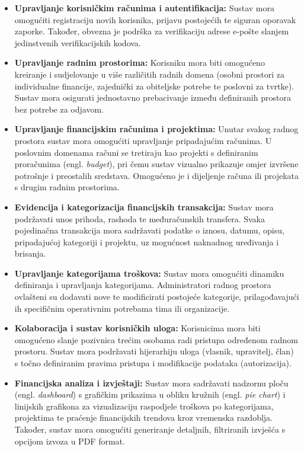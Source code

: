 \documentclass[a4paper,12pt,oneside]{article}
\begin{document}
	\begin{itemize}
		\item \textbf{Upravljanje korisničkim računima i autentifikacija:} Sustav mora omogućiti registraciju novih korisnika, prijavu postojećih te siguran oporavak zaporke. Također, obvezna je podrška za verifikaciju adrese e-pošte slanjem jedinstvenih verifikacijskih kodova.
		
		\item \textbf{Upravljanje radnim prostorima:} Korisniku mora biti omogućeno kreiranje i sudjelovanje u više različitih radnih domena (osobni prostori za individualne financije, zajednički za obiteljske potrebe te poslovni za tvrtke). Sustav mora osigurati jednostavno prebacivanje između definiranih prostora bez potrebe za odjavom.
		
		\item \textbf{Upravljanje financijskim računima i projektima:} Unutar svakog radnog prostora sustav mora omogućiti upravljanje pripadajućim računima. U poslovnim domenama računi se tretiraju kao projekti s definiranim proračunima (engl. \textit{budget}), pri čemu sustav vizualno prikazuje omjer izvršene potrošnje i preostalih sredstava. Omogućeno je i dijeljenje računa ili projekata s drugim radnim prostorima.
		
		\item \textbf{Evidencija i kategorizacija financijskih transakcija:} Sustav mora podržavati unos prihoda, rashoda te međuračunskih transfera. Svaka pojedinačna transakcija mora sadržavati podatke o iznosu, datumu, opisu, pripadajućoj kategoriji i projektu, uz mogućnost naknadnog uređivanja i brisanja.
		
		\item \textbf{Upravljanje kategorijama troškova:} Sustav mora omogućiti dinamiku definiranja i upravljanja kategorijama. Administratori radnog prostora ovlašteni su dodavati nove te modificirati postojeće kategorije, prilagođavajući ih specifičnim operativnim potrebama tima ili organizacije.
		
		\item \textbf{Kolaboracija i sustav korisničkih uloga:} Korisnicima mora biti omogućeno slanje pozivnica trećim osobama radi pristupa određenom radnom prostoru. Sustav mora podržavati hijerarhiju uloga (vlasnik, upravitelj, član) s točno definiranim pravima pristupa i modifikacije podataka (autorizacija).
		
		\item \textbf{Financijska analiza i izvještaji:} Sustav mora sadržavati nadzornu ploču (engl. \textit{dashboard}) s grafičkim prikazima u obliku kružnih (engl. \textit{pie chart}) i linijskih grafikona za vizualizaciju raspodjele troškova po kategorijama, projektima te praćenje financijskih trendova kroz vremenska razdoblja. Također, sustav mora omogućiti generiranje detaljnih, filtriranih izvješća s opcijom izvoza u PDF format.
		

\end{itemize}
\end{document}
